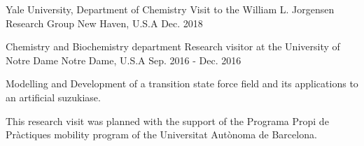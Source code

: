 

\begin{cventries}

  \cventry
    {Yale University, Department of Chemistry} %
    {Visit to the William L. Jorgensen Research Group} %
    {New Haven, U.S.A} %
    {Dec. 2018} %
    {~}

  \cventry
    {Chemistry and Biochemistry department} %
    {Research visitor at the University of Notre Dame} %
    {Notre Dame, U.S.A} %
    {Sep. 2016 - Dec. 2016} %
    {
      \begin{cvitems} %
        \item {Modelling and Development of a transition state force field and its applications to an artificial suzukiase.}
        \item {This research visit was planned with the support of the Programa Propi de Pràctiques mobility program of the Universitat Autònoma de Barcelona.}
      \end{cvitems}
    }

\end{cventries}
